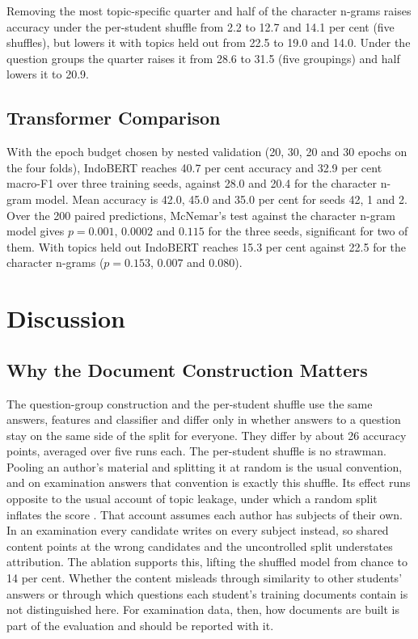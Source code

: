 \documentclass[conference]{IEEEtran}
\begin{document}
Removing the most topic-specific quarter and half of the character n-grams raises accuracy under the per-student shuffle from 2.2 to 12.7 and 14.1 per cent (five shuffles), but lowers it with topics held out from 22.5 to 19.0 and 14.0. Under the question groups the quarter raises it from 28.6 to 31.5 (five groupings) and half lowers it to 20.9.

\subsection{Transformer Comparison}

With the epoch budget chosen by nested validation (20, 30, 20 and 30 epochs on the four folds), IndoBERT reaches 40.7 per cent accuracy and 32.9 per cent macro-F1 over three training seeds, against 28.0 and 20.4 for the character n-gram model. Mean accuracy is 42.0, 45.0 and 35.0 per cent for seeds 42, 1 and 2. Over the 200 paired predictions, McNemar's test against the character n-gram model gives $p = 0.001$, $0.0002$ and $0.115$ for the three seeds, significant for two of them. With topics held out IndoBERT reaches 15.3 per cent against 22.5 for the character n-grams ($p = 0.153$, $0.007$ and $0.080$).

\section{Discussion}

\subsection{Why the Document Construction Matters}

The question-group construction and the per-student shuffle use the same answers, features and classifier and differ only in whether answers to a question stay on the same side of the split for everyone. They differ by about 26 accuracy points, averaged over five runs each. The per-student shuffle is no strawman. Pooling an author's material and splitting it at random is the usual convention, and on examination answers that convention is exactly this shuffle. Its effect runs opposite to the usual account of topic leakage, under which a random split inflates the score \cite{Wegmann2022,Altakrori2021}. That account assumes each author has subjects of their own. In an examination every candidate writes on every subject instead, so shared content points at the wrong candidates and the uncontrolled split understates attribution. The ablation supports this, lifting the shuffled model from chance to 14 per cent. Whether the content misleads through similarity to other students' answers or through which questions each student's training documents contain is not distinguished here. For examination data, then, how documents are built is part of the evaluation and should be reported with it.
\end{document}
